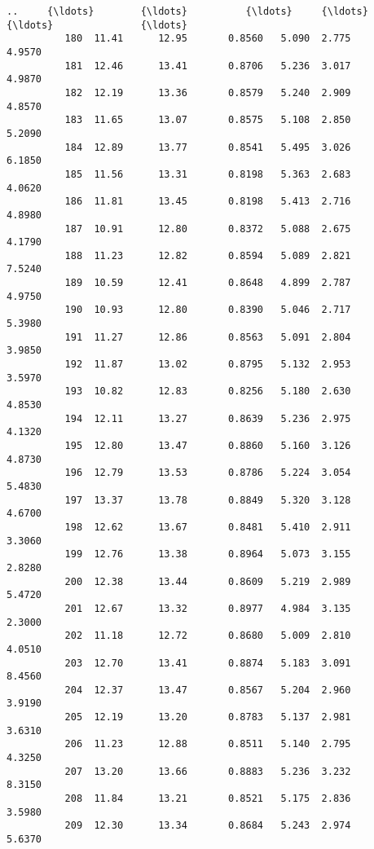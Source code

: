 \documentclass[11pt]{article}
\begin{document}
\begin{Verbatim}[commandchars=\\\{\}]
          ..     {\ldots}        {\ldots}          {\ldots}     {\ldots}    {\ldots}               {\ldots}   
          180  11.41      12.95       0.8560   5.090  2.775            4.9570   
          181  12.46      13.41       0.8706   5.236  3.017            4.9870   
          182  12.19      13.36       0.8579   5.240  2.909            4.8570   
          183  11.65      13.07       0.8575   5.108  2.850            5.2090   
          184  12.89      13.77       0.8541   5.495  3.026            6.1850   
          185  11.56      13.31       0.8198   5.363  2.683            4.0620   
          186  11.81      13.45       0.8198   5.413  2.716            4.8980   
          187  10.91      12.80       0.8372   5.088  2.675            4.1790   
          188  11.23      12.82       0.8594   5.089  2.821            7.5240   
          189  10.59      12.41       0.8648   4.899  2.787            4.9750   
          190  10.93      12.80       0.8390   5.046  2.717            5.3980   
          191  11.27      12.86       0.8563   5.091  2.804            3.9850   
          192  11.87      13.02       0.8795   5.132  2.953            3.5970   
          193  10.82      12.83       0.8256   5.180  2.630            4.8530   
          194  12.11      13.27       0.8639   5.236  2.975            4.1320   
          195  12.80      13.47       0.8860   5.160  3.126            4.8730   
          196  12.79      13.53       0.8786   5.224  3.054            5.4830   
          197  13.37      13.78       0.8849   5.320  3.128            4.6700   
          198  12.62      13.67       0.8481   5.410  2.911            3.3060   
          199  12.76      13.38       0.8964   5.073  3.155            2.8280   
          200  12.38      13.44       0.8609   5.219  2.989            5.4720   
          201  12.67      13.32       0.8977   4.984  3.135            2.3000   
          202  11.18      12.72       0.8680   5.009  2.810            4.0510   
          203  12.70      13.41       0.8874   5.183  3.091            8.4560   
          204  12.37      13.47       0.8567   5.204  2.960            3.9190   
          205  12.19      13.20       0.8783   5.137  2.981            3.6310   
          206  11.23      12.88       0.8511   5.140  2.795            4.3250   
          207  13.20      13.66       0.8883   5.236  3.232            8.3150   
          208  11.84      13.21       0.8521   5.175  2.836            3.5980   
          209  12.30      13.34       0.8684   5.243  2.974            5.6370   
          

\end{Verbatim}
\end{document}
